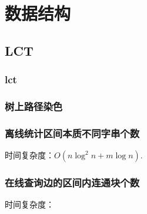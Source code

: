 \documentclass{article}
\begin{document}
\begin{titlepage}

\thispagestyle{empty}
\pagebreak
\pagestyle{plain}
\tableofcontents
\end{titlepage}


% 
% 
% 


\section{数据结构}
\subsection{LCT}
\subsubsection{lct}

\subsubsection{树上路径染色}

\subsubsection{离线统计区间本质不同字串个数}
时间复杂度：$O(n \log^{2}n + m \log n)$.

\subsubsection{在线查询边的区间内连通块个数}
时间复杂度：

\end{document}
